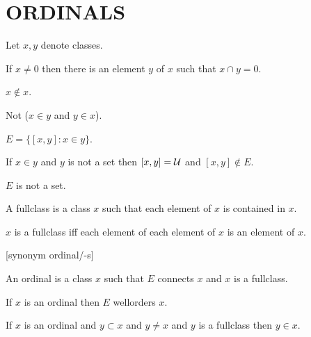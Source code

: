 \documentclass[a4paper,draft]{amsproc}
\begin{document}
\section{ORDINALS}
\begin{forthel}

Let $x, y$ denote classes.
\begin{axiom}
If $x \neq 0$ then there is an element $y$ of $x$ such that $x \cap y = 0$.
\end{axiom}

\begin{theorem}[101]
$x \notin x$.
\end{theorem}

\begin{theorem}[102]
Not ($x \in y$ and $y \in x$).
\end{theorem}

\begin{definition}[103]
$E = \{[x,y] : x \in y\}$.
\end{definition}

\begin{lemma}
If $x \in y$ and $y$ is not a set then $[x,y] = \cal{U}$ and $[x,y] \notin E$.
\end{lemma}

\begin{theorem}[104]
$E$ is not a set.
\end{theorem}

\begin{definition}[105]
A fullclass is a class $x$ such that each element of $x$ is contained in $x$.
\end{definition}

\begin{lemma}
$x$ is a fullclass iff each element of each element of $x$ is an element of $x$.
\end{lemma}

[synonym ordinal/-s]
\begin{definition}[106]
An ordinal is a class $x$ such that $E$ connects $x$ and $x$ is a fullclass.
\end{definition}

\begin{theorem}[107]
If $x$ is an ordinal then $E$ wellorders $x$.
\end{theorem}

\begin{theorem}[108]
If $x$ is an ordinal and $y \subset x$ and $y \neq x$ and $y$ is a fullclass then $y \in x$.
\end{theorem}


\end{forthel}
\end{document}
